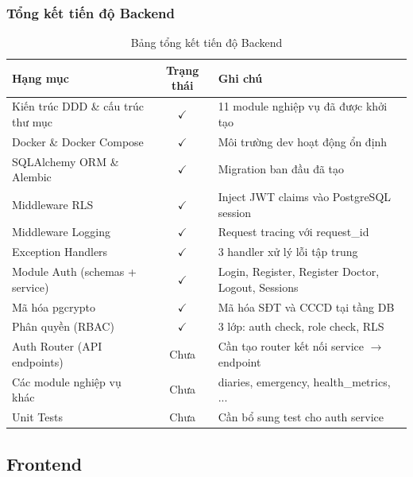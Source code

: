 \documentclass[a4paper,12pt]{article}
\begin{document}
\subsubsection{Tổng kết tiến độ Backend}

\begin{table}[H]
    \centering
    \begin{tabularx}{\textwidth}{|l|c|X|}
    \hline
    \textbf{Hạng mục} & \textbf{Trạng thái} & \textbf{Ghi chú} \\
    \hline
    {Kiến trúc DDD \& cấu trúc thư mục} & $\checkmark$ & 11 module nghiệp vụ đã được khởi tạo \\
    \hline
    {Docker \& Docker Compose} & $\checkmark$ & Môi trường dev hoạt động ổn định \\
    \hline
    {SQLAlchemy ORM \& Alembic} & $\checkmark$ & Migration ban đầu đã tạo \\
    \hline
    Middleware RLS & $\checkmark$ & Inject JWT claims vào PostgreSQL session \\
    \hline
    Middleware Logging & $\checkmark$ & Request tracing với request\_id \\
    \hline
    Exception Handlers & $\checkmark$ & 3 handler xử lý lỗi tập trung \\
    \hline
    Module Auth (schemas + service) & $\checkmark$ & Login, Register, Register Doctor, Logout, Sessions \\
    \hline
    Mã hóa pgcrypto & $\checkmark$ & Mã hóa SĐT và CCCD tại tầng DB \\
    \hline
    Phân quyền (RBAC) & $\checkmark$ & 3 lớp: auth check, role check, RLS \\
    \hline
    Auth Router (API endpoints) & Chưa & Cần tạo router kết nối service $\rightarrow$ endpoint \\
    \hline
    Các module nghiệp vụ khác & Chưa & diaries, emergency, health\_metrics, ... \\
    \hline
    Unit Tests & Chưa & Cần bổ sung test cho auth service \\
    \hline
    \end{tabularx}
    \caption{Bảng tổng kết tiến độ Backend}
\end{table}

\subsection{Frontend}
\end{document}
